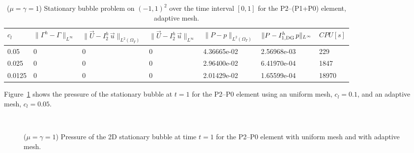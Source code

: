 \documentclass[a4paper,12pt,onecolumn]{article}
\newcommand{\errorXx}{\|\Gamma^h - \Gamma\|_{L^\infty}}
\newcommand{\LerrorUu}[1]{\|\vec U - I^h_{#1}\,\vec u\|_{L^2(\Omega_T)}}
\newcommand{\errorUu}[1]{\|\vec U - I^h_{#1}\,\vec u\|_{L^\infty}}
\newcommand{\errorPp}[1]{\|P - I^h_{#1}\,p\|_{L^\infty}}
\newcommand{\LerrorPp}{\|P - p\|_{L^2(\Omega_T)}}
\begin{document}
\begin{table}
 \center
\begin{tabular}{llHllHl}
\hline
$c_l$ & $\errorXx$ & $\LerrorUu2$ & $\errorUu2$ & $\LerrorPp$ &
$\errorPp{1,\rm{DG}}$ & $CPU[s]$ \\
 & 0 & 0 & 0 & 4.36665e-02 & 2.56968e-03 & 229\\
0.025 & 0 & 0 & 0 & 2.96400e-02 & 6.41970e-04 & 1847\\
0.0125 & 0 & 0 & 0 & 2.01429e-02 & 1.65599e-04 & 18970\\
\hline
\end{tabular}
\caption{($\mu=\gamma=1$) Stationary bubble problem on $(-1,1)^2$ over the time
interval $[0,1]$ for the P2--(P1+P0) element, adaptive mesh.}
\label{tab:bubble2Dp2p1p0adaptive}
\end{table}

Figure~\ref{fig:2d_stationary_bubble} shows the pressure of the stationary
bubble at $t=1$ for the P2--P0 element using an uniform mesh, $c_l=0.1$, and an
adaptive mesh, $c_l=0.05$.
\begin{figure}[htbp]
  \centering
  \quad
  \\
  \caption{($\mu=\gamma=1$) Pressure of the 2D stationary bubble at time $t=1$
for the P2--P0 element with uniform mesh and with adaptive mesh.}
  \label{fig:2d_stationary_bubble}
\end{figure}
\end{document}
